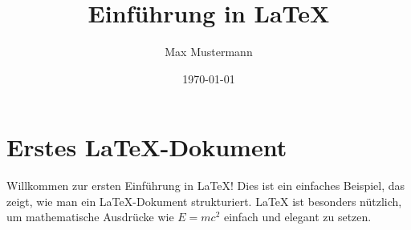 \documentclass{article}
\begin{document}
\title{Einführung in LaTeX}
\author{Max Mustermann}
\date{\today}
\maketitle

\section{Erstes LaTeX-Dokument}

Willkommen zur ersten Einführung in LaTeX! Dies ist ein einfaches Beispiel, das zeigt, wie man ein LaTeX-Dokument strukturiert. LaTeX ist besonders nützlich, um mathematische Ausdrücke wie \( E = mc^2 \) einfach und elegant zu setzen. 
\end{document}
